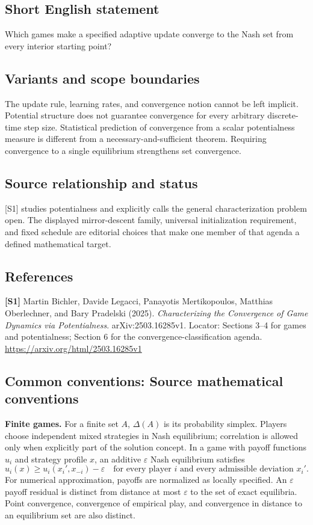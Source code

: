 \documentclass[11pt,a4paper]{article}
\begin{document}
\subsection*{Short English statement}
Which games make a specified adaptive update converge to the Nash set from every interior starting point?
\subsection*{Variants and scope boundaries}
The update rule, learning rates, and convergence notion cannot be left implicit. Potential structure does not guarantee convergence for every arbitrary discrete-time step size. Statistical prediction of convergence from a scalar potentialness measure is different from a necessary-and-sufficient theorem. Requiring convergence to a single equilibrium strengthens set convergence.
\subsection*{Source relationship and status}
[S1] studies potentialness and explicitly calls the general characterization problem open. The displayed mirror-descent family, universal initialization requirement, and fixed schedule are editorial choices that make one member of that agenda a defined mathematical target.
\subsection*{References}
\begingroup\footnotesize\raggedright
{\footnotesize\raggedright
\textbf{[S1]} Martin Bichler, Davide Legacci, Panayotis Mertikopoulos, Matthias Oberlechner, and Bary Pradelski (2025). \emph{Characterizing the Convergence of Game Dynamics via Potentialness}. arXiv:2503.16285v1. Locator: Sections 3--4 for games and potentialness; Section 6 for the convergence-classification agenda. \url{https://arxiv.org/html/2503.16285v1}\par}
\par\endgroup

\subsection*{Common conventions: Source mathematical conventions}

\textbf{Finite games.} For a finite set $A$, $\Delta(A)$ is its probability
simplex. Players choose independent mixed strategies in Nash equilibrium;
correlation is allowed only when explicitly part of the solution concept.
In a game with payoff functions $u_i$ and strategy profile $x$, an additive
$\varepsilon$ Nash equilibrium satisfies
\[
 u_i(x)\geq u_i(x_i',x_{-i})-\varepsilon
 \quad\text{for every player $i$ and every admissible deviation $x_i'$}.
\]
For numerical approximation, payoffs are normalized as locally specified.
An $\varepsilon$ payoff residual is distinct from distance at most
$\varepsilon$ to the set of exact equilibria. Point convergence, convergence
of empirical play, and convergence in distance to an equilibrium set are
also distinct.
\end{document}
